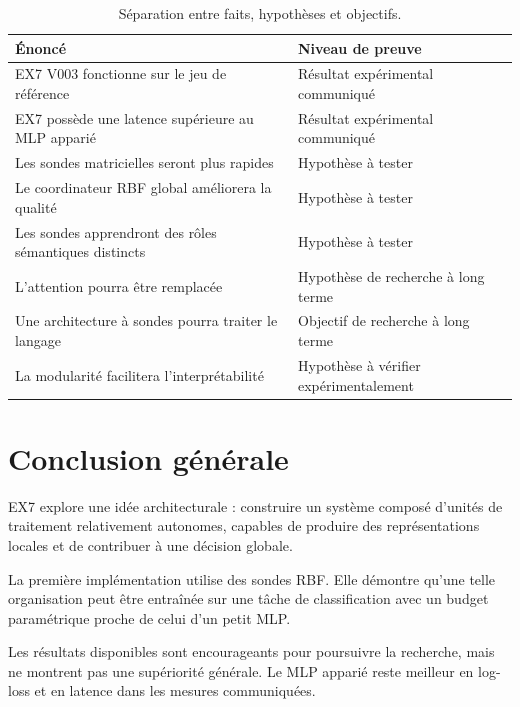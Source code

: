 \documentclass[11pt,a4paper]{report}
\begin{document}
\begin{table}[H]
\centering
\small
\begin{tabularx}{\textwidth}{
  >{\raggedright\arraybackslash}p{4cm}
  X
}
\toprule
Énoncé & Niveau de preuve\\
\midrule
EX7 V003 fonctionne sur le jeu de référence
&
Résultat expérimental communiqué\\

EX7 possède une latence supérieure au MLP apparié
&
Résultat expérimental communiqué\\

Les sondes matricielles seront plus rapides
&
Hypothèse à tester\\

Le coordinateur RBF global améliorera la qualité
&
Hypothèse à tester\\

Les sondes apprendront des rôles sémantiques distincts
&
Hypothèse à tester\\

L'attention pourra être remplacée
&
Hypothèse de recherche à long terme\\

Une architecture à sondes pourra traiter le langage
&
Objectif de recherche à long terme\\

La modularité facilitera l'interprétabilité
&
Hypothèse à vérifier expérimentalement\\
\bottomrule
\end{tabularx}
\caption{Séparation entre faits, hypothèses et objectifs.}
\end{table}

\chapter{Conclusion générale}

EX7 explore une idée architecturale : construire un système
composé d'unités de traitement relativement autonomes,
capables de produire des représentations locales et de
contribuer à une décision globale.

La première implémentation utilise des sondes RBF.
Elle démontre qu'une telle organisation peut être entraînée
sur une tâche de classification avec un budget paramétrique
proche de celui d'un petit MLP.

Les résultats disponibles sont encourageants pour poursuivre
la recherche, mais ne montrent pas une supériorité générale.
Le MLP apparié reste meilleur en log-loss et en latence
dans les mesures communiquées.
\end{document}
